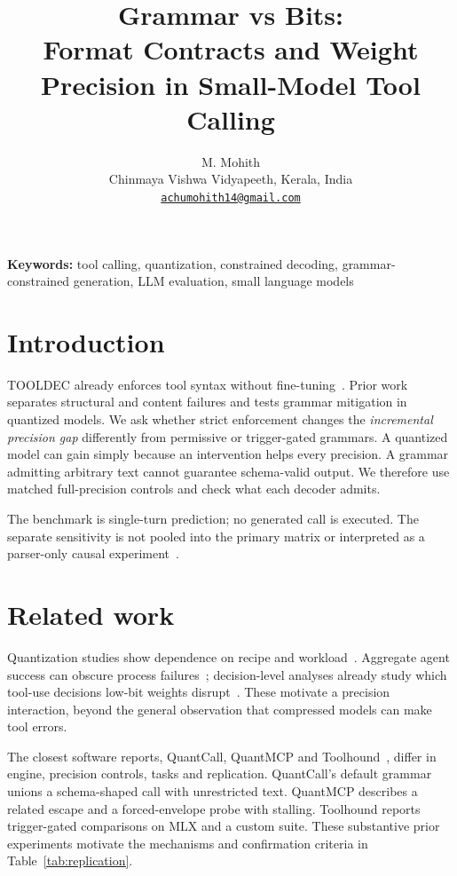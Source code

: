 \documentclass[10pt,twocolumn]{article}
\title{Grammar vs Bits:\\Format Contracts and Weight Precision in Small-Model Tool Calling}
\author{M. Mohith\\
\small Chinmaya Vishwa Vidyapeeth, Kerala, India\\
\small\href{mailto:achumohith14@gmail.com}{\nolinkurl{achumohith14@gmail.com}}}
\date{}
\begin{document}
\maketitle
\begin{abstract}

\end{abstract}
\par\noindent\textbf{Keywords:} tool calling, quantization, constrained decoding, grammar-constrained generation, LLM evaluation, small language models\par

\section{Introduction}


TOOLDEC already enforces tool syntax without fine-tuning~\cite{tooldec}. Prior work separates structural and content failures and tests grammar mitigation in quantized models. We ask whether strict enforcement changes the \emph{incremental precision gap} differently from permissive or trigger-gated grammars. A quantized model can gain simply because an intervention helps every precision. A grammar admitting arbitrary text cannot guarantee schema-valid output. We therefore use matched full-precision controls and check what each decoder admits.

The benchmark is single-turn prediction; no generated call is executed. The separate sensitivity is not pooled into the primary matrix or interpreted as a parser-only causal experiment~\cite{metaprompt}.

\section{Related work}

Quantization studies show dependence on recipe and workload~\cite{bf16}. Aggregate agent success can obscure process failures~\cite{flat}; decision-level analyses already study which tool-use decisions low-bit weights disrupt~\cite{wu}. These motivate a precision interaction, beyond the general observation that compressed models can make tool errors.

The closest software reports, QuantCall, QuantMCP and Toolhound~\cite{quantcall,quantmcp,toolhound}, differ in engine, precision controls, tasks and replication. QuantCall's default grammar unions a schema-shaped call with unrestricted text. QuantMCP describes a related escape and a forced-envelope probe with stalling. Toolhound reports trigger-gated comparisons on MLX and a custom suite. These substantive prior experiments motivate the mechanisms and confirmation criteria in Table~\ref{tab:replication}.
\end{document}
